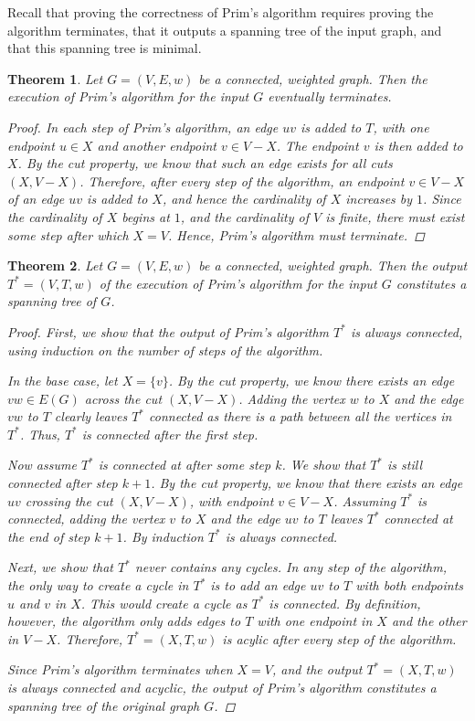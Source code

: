 \documentclass[a4paper,11pt]{report}
\theoremstyle{plain}
\newtheorem{thm}{Theorem}[section]
\theoremstyle{definition}
\begin{document}
Recall that proving the correctness of Prim's algorithm requires proving the
algorithm terminates, that it outputs a spanning tree of the input graph, and
that this spanning tree is minimal.

\begin{thm}
Let $G = (V, E, w)$ be a connected, weighted graph. Then the
execution of Prim's algorithm for the input $G$ eventually terminates.

\begin{proof}
In each step of Prim's algorithm, an edge $uv$ is added to $T$, with one
endpoint $u \in X$ and another endpoint $v \in V - X$. The endpoint $v$ is then
added to $X$. By the cut property, we know that such an edge exists for all
cuts $(X, V - X)$. Therefore, after every step of the algorithm, an
endpoint $v \in V - X$ of an edge $uv$ is added to $X$, and hence the
cardinality of $X$ increases by $1$. Since the cardinality of $X$ begins at
$1$, and the cardinality of $V$ is finite, there must exist some step after
which $X = V$. Hence, Prim's algorithm must terminate.
\end{proof}
\end{thm}

\begin{thm}
Let $G = (V, E, w)$ be a connected, weighted graph. Then the output
$T^* = (V, T, w)$ of the execution of Prim's algorithm for the input $G$
constitutes a spanning tree of $G$.

\begin{proof}
First, we show that the output of Prim's algorithm $T^*$ is always connected,
using induction on the number of steps of the algorithm.

In the base case, let $X = \{v\}$. By the cut property, we know
there exists an edge $vw \in E(G)$ across the cut $(X, V - X)$. Adding the
vertex $w$ to $X$ and the edge $vw$ to $T$ clearly leaves $T^*$ connected as
there is a path between all the vertices in $T^*$. Thus, $T^*$ is connected
after the first step.

Now assume $T^*$ is connected at after some step $k$. We show that $T^*$ is
still connected after step $k + 1$. By the cut property, we know that there
exists an edge $uv$ crossing the cut $(X, V - X)$, with endpoint $v \in V - X$.
Assuming $T^*$ is connected, adding the vertex $v$ to $X$ and the edge $uv$ to
$T$ leaves $T^*$ connected at the end of step $k + 1$. By induction $T^*$ is
always connected.

Next, we show that $T^*$ never contains any cycles. In any step of the
algorithm, the only way to create a cycle in $T^*$ is to add an edge $uv$ to
$T$ with both endpoints $u$ and $v$ in $X$. This would create a cycle as $T^*$
is connected. By definition, however, the algorithm only adds edges to $T$ with
one endpoint in $X$ and the other in $V - X$. Therefore, $T^* = (X, T, w)$ is
acylic after every step of the algorithm.

Since Prim's algorithm terminates when $X = V$, and the output
$T^* = (X, T, w)$ is always connected and acyclic, the output of Prim's
algorithm constitutes a spanning tree of the original graph $G$.
\end{proof}
\end{thm}
\end{document}
